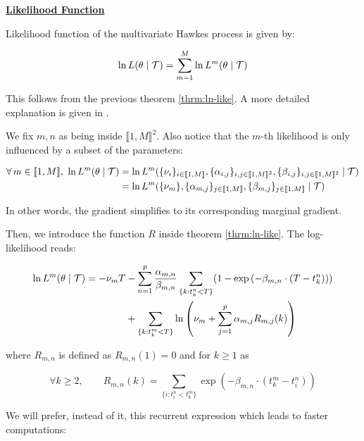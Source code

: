 \vspace{0.6 cm}
\underline{\textbf{Likelihood Function}}

Likelihood function of the multivariate Hawkes process is given by:

\begin{equation}
\ln L( \theta \mid \mathcal{T} ) = \sum_{m = 1}^M \ln L^m( \theta \mid \mathcal{T} )
\label{eq:ln_multi}
\end{equation}

This follows from the previous theorem \ref{thrm:ln-like}. A more detailed explanation is given in \cite{Likelihood_Hawkes}.



We fix $m,n$ as being inside $\llbracket 1, M \rrbracket ^2 $. Also notice that the $m$-th likelihood is only influenced by a subset of the parameters:

\begin{align*}
\forall m \in \llbracket 1, M \rrbracket , \  \ln L^m( \theta \mid \Tau ) &= \ln L^m( 
\{ \nu_i \}_{ i \in  \llbracket 1, M \rrbracket  },
\{ \alpha_{i,j} \} _{ i,j \in  \llbracket 1, M \rrbracket ^2 },
\{ \beta_{i,j} \}_{ i,j \in  \llbracket 1, M \rrbracket ^2 }
\mid \Tau ) \\
&= \ln L^m( 
\{ \nu_m \},
\{ \alpha_{m,j} \} _{ j \in  \llbracket 1, M \rrbracket  },
\{ \beta_{m,j} \}_{j \in  \llbracket 1, M \rrbracket  }
\mid \Tau )
\end{align*}

In other words, the gradient simplifies to its corresponding marginal gradient. 

Then, we introduce the function $R$ inside theorem \ref{thrm:ln-like}. The log-likelihood reads:


\begin{align}
\ln L^m( \theta \mid \mathcal{T} ) = - \nu_m T &- \sum^p_{n=1} \frac {\alpha_{m,n} } {\beta_{m,n}}  \sum_{ \{k : t_k^n < T \} } (1 - \exp \left ( - \beta_{m,n} \cdot ( T - t_k^n ) \right )) \notag \\ 
&+ \sum_{ \{k : t_k^m < T \} } \ln \left ( \nu_m + \sum_{j=1}^p \alpha_{m,j} R_{m,j} (k) \right ) 
\end{align}

where $R_{m,n}$ is defined as $R_{m,n}(1) = 0 $ and for $k \geq 1$ as  

\begin{equation*}
\forall k \geq 2, \qquad R_{m,n} (k) = \sum_{ \{i : t_i^n < t_k^m \} } \exp \left ( - \beta_{m,n} \cdot ( t_k^m - t_i^n )  \right ) 
\end{equation*}

We will prefer, instead of it, this recurrent expression which leads to faster computations:

